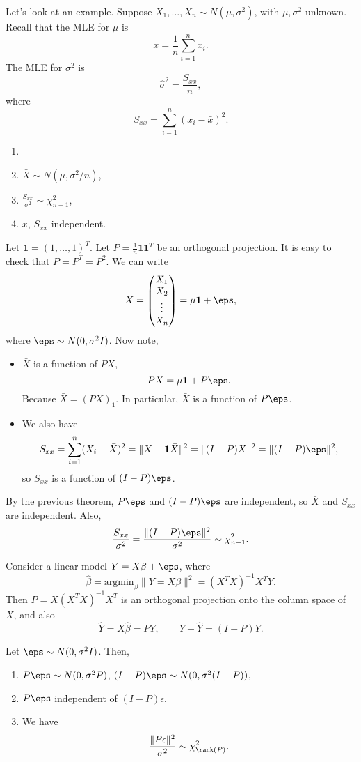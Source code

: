 \documentclass[12pt]{article}
\begin{document}
Let's look at an example. Suppose $X_1, \ldots, X_n \sim N(\mu, \sigma^2)$, with $\mu, \sigma^2$ unknown. Recall that the MLE for $\mu$ is
\[
\bar x = \frac{1}{n} \sum_{i = 1}^{n} x_i.
\]
The MLE for $\sigma^2$ is
\[
\hat \sigma^2 = \frac{S_{xx}}{n},
\]
where
\[
S_{xx} = \sum_{i = 1}^{n} (x_i - \bar x)^2.
\]
\begin{theorem}
	\begin{enumerate}[\normalfont(i)]
		\item[]
		\item $\bar X \sim N(\mu, \sigma^2/n)$,
		\item $\frac{S_{xx}}{\sigma^2} \sim \chi_{n-1}^2$,
		\item $\bar x$, $S_{xx}$ independent.
	\end{enumerate}
\end{theorem}

\begin{proofbox}
	Let $\mathbf{1} = (1, \ldots, 1)^{T}$. Let $P= \frac{1}{n} \mathbf{1} \mathbf{1}^{T}$ be an orthogonal projection. It is easy to check that $P = P^{T} = P^2$. We can write
	\[
	X =
	\begin{pmatrix}
		X_1 \\ X_2 \\ \vdots \\ X_n
	\end{pmatrix}
	 = \mu \mathbf{1} + \eps,
	\]
	where $\eps \sim N(0, \sigma^2 I)$. Now note,
	\begin{itemize}
		\item $\bar X$ is a function of $PX$,
			\[
			PX = \mu \mathbf{1} + P\eps.
			\]
			Because $\bar X = (PX)_1$. In particular, $\bar X$ is a function of $P\eps$.
		\item We also have
			\[
			S_{x x} = \sum_{i = 1}^{n} (X_i - \bar X)^2 = \|X - \mathbf{1}\bar X \|^2 = \|(I-P)X\|^2 = \|(I-P)\eps\|^2,
			\]
			so $S_{x x}$ is a function of $(I-P)\eps$.
	\end{itemize}
	By the previous theorem, $P\eps$ and $(I-P)\eps$ are independent, so $\bar X$ and $S_{xx}$ are independent. Also,
	\[
	\frac{S_{x x}}{\sigma^2} = \frac{\|(I-P)\eps\|^2}{\sigma^2} \sim \chi_{n-1}^2.
	\]
\end{proofbox}


Consider a linear model $Y = X \beta + \eps$, where
\[
	\hat \beta = \mathrm{argmin}_{\beta} \|Y = X \beta\|^2 = (X^{T}X)^{-1}X^{T}Y.
\]
Then $P = X(X^{T}X)^{-1}X^{T}$ is an orthogonal projection onto the column space of $X$, and also
\[
\hat Y = X \hat \beta = PY, \qquad Y - \hat Y = (I - P)Y.
\]
\begin{theorem}
	Let $\eps \sim N(0, \sigma^2 I)$. Then,
	\begin{enumerate}[\normalfont1.]
		\item $P \eps \sim N(0, \sigma^2 P)$, $(I-P)\eps \sim N(0, \sigma^2(I-P))$,
		\item $P \eps$ independent of $(I - P)\epsilon$.
		\item We have
			\[
				\frac{\|P \epsilon\|^2}{\sigma^2} \sim \chi^2_{\rank(P)}.
			\]
	\end{enumerate}
\end{theorem}
\end{document}

